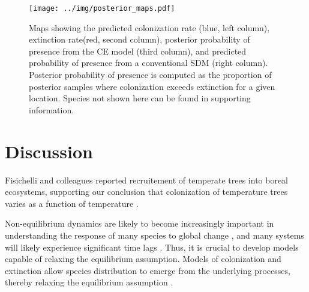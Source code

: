 \documentclass[11pt]{article}
\begin{document}
\begin{figure}
	\texttt{[image: ../img/posterior\_maps.pdf]}
	\caption{
		Maps showing the predicted colonization rate (blue, left column), extinction rate(red, second column), posterior probability of presence from the CE model (third column), and predicted probability of presence from a conventional SDM (right column).
		Posterior probability of presence is computed as the proportion of posterior samples where colonization exceeds extinction for a given location.
		Species not shown here can be found in supporting information.
	}
	\label{fig:response_curves}
\end{figure}


\section*{Discussion}

Fisichelli and colleagues reported recruitement of temperate trees into boreal ecosystems, supporting our conclusion that colonization of temperature trees varies as a function of temperature \cite{Fisichelli2014}.

Non-equilibrium dynamics are likely to become increasingly important in understanding the response of many species to global change \cite{Araujo2005, Svenning2013}, and many systems will likely experience significant time lags \cite{Garcia2013, Wu2015}. 
Thus, it is crucial to develop models capable of relaxing the equilibrium assumption. 
Models of colonization and extinction allow species distribution to emerge from the underlying processes, thereby relaxing the equilibrium assumption \cite{Holt2000, Yackulic2015}.
\end{document}
